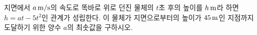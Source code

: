 지면에서 $a\mkern3mu \mathrm{m/s}$의 속도로 똑바로 위로 던진 물체의 $t$초 후의 높이를 $h\mkern3mu \mathrm{m}$라 하면 $h=at-5t^2$인 관계가 성립한다. 이 물체가 지면으로부터의 높이가 $45\mkern3mu \mathrm{m}$인 지점까지 도달하기 위한 양수 $a$의 최솟값을 구하시오.
